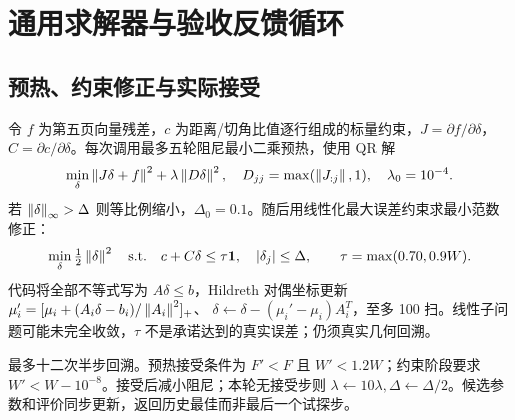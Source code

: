 \begin{center}\end{center}

\clearpage
\section{通用求解器与验收反馈循环}
\subsection{预热、约束修正与实际接受}
令 $f$ 为第五页向量残差，$c$ 为距离/切角比值逐行组成的标量约束，$J=\partial f/\partial\delta$，$C=\partial c/\partial\delta$。每次调用最多五轮阻尼最小二乘预热，使用 QR 解
\begin{equation}
 \min_\delta\left\lVert J\delta+f\right\rVert^2+\lambda\left\lVert D\delta\right\rVert^2,
 \quad D_{jj}=\max(\left\lVert J_{:j}\right\rVert,1),\quad\lambda_0=10^{-4}.
\end{equation}
若 $\left\lVert\delta\right\rVert_\infty>\Delta$ 则等比例缩小，$\Delta_0=0.1$。随后用线性化最大误差约束求最小范数修正：
\begin{equation}
 \min_\delta\tfrac12\left\lVert\delta\right\rVert^2\quad\text{s.t.}\quad
 c+C\delta\le\tau\mathbf1,\quad|\delta_j|\le\Delta,\qquad
 \tau=\max(0.70,0.9W).
\end{equation}
代码将全部不等式写为 $A\delta\le b$，Hildreth 对偶坐标更新
$\mu_i'=[\mu_i+(A_i\delta-b_i)/\left\lVert A_i\right\rVert^2]_+$、
$\delta\leftarrow\delta-(\mu_i'-\mu_i)A_i^T$，至多 100 扫。线性子问题可能未完全收敛，$\tau$ 不是承诺达到的真实误差；仍须真实几何回溯。

最多十二次半步回溯。预热接受条件为 $F'<F$ 且 $W'<1.2W$；约束阶段要求 $W'<W-10^{-8}$。接受后减小阻尼；本轮无接受步则 $\lambda\leftarrow10\lambda,\Delta\leftarrow\Delta/2$。候选参数和评价同步更新，返回历史最佳而非最后一个试探步。

